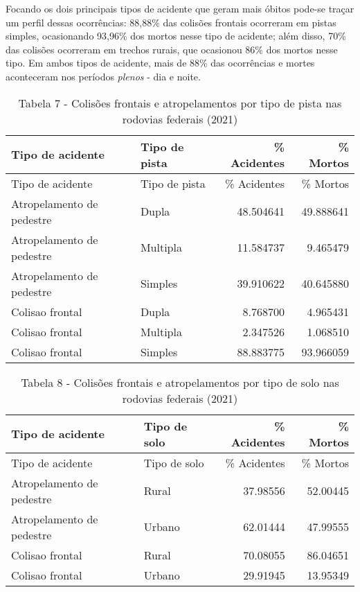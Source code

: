 \documentclass[
]{article}
\begin{document}
Focando os dois principais tipos de acidente que geram mais óbitos
pode-se traçar um perfil dessas ocorrências: 88,88\% das colisões
frontais ocorreram em pistas simples, ocasionando 93,96\% dos mortos
nesse tipo de acidente; além disso, 70\% das colisões ocorreram em
trechos rurais, que ocasionou 86\% dos mortos nesse tipo. Em ambos tipos
de acidente, mais de 88\% das ocorrências e mortes aconteceram nos
períodos \emph{plenos} - dia e noite.

\begin{longtable}[]{@{}llrr@{}}
\caption{Tabela 7 - Colisões frontais e atropelamentos por tipo de pista
nas rodovias federais (2021)}\tabularnewline
\toprule
Tipo de acidente & Tipo de pista & \% Acidentes & \% Mortos \\
\midrule
\endfirsthead
\toprule
Tipo de acidente & Tipo de pista & \% Acidentes & \% Mortos \\
\midrule
\endhead
Atropelamento de pedestre & Dupla & 48.504641 & 49.888641 \\
Atropelamento de pedestre & Multipla & 11.584737 & 9.465479 \\
Atropelamento de pedestre & Simples & 39.910622 & 40.645880 \\
Colisao frontal & Dupla & 8.768700 & 4.965431 \\
Colisao frontal & Multipla & 2.347526 & 1.068510 \\
Colisao frontal & Simples & 88.883775 & 93.966059 \\
\bottomrule
\end{longtable}

\begin{longtable}[]{@{}llrr@{}}
\caption{Tabela 8 - Colisões frontais e atropelamentos por tipo de solo
nas rodovias federais (2021)}\tabularnewline
\toprule
Tipo de acidente & Tipo de solo & \% Acidentes & \% Mortos \\
\midrule
\endfirsthead
\toprule
Tipo de acidente & Tipo de solo & \% Acidentes & \% Mortos \\
\midrule
\endhead
Atropelamento de pedestre & Rural & 37.98556 & 52.00445 \\
Atropelamento de pedestre & Urbano & 62.01444 & 47.99555 \\
Colisao frontal & Rural & 70.08055 & 86.04651 \\
Colisao frontal & Urbano & 29.91945 & 13.95349 \\
\bottomrule
\end{longtable}
\end{document}
